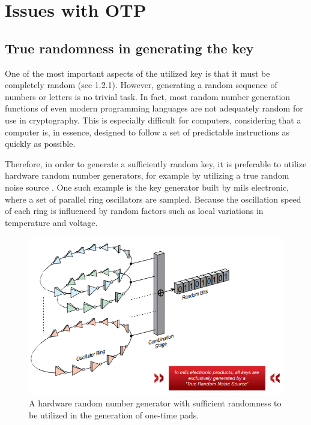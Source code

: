 \documentclass[12pt]{report}
\begin{document}
\section{Issues with OTP}
\subsection{True randomness in generating the key}
One of the most important aspects of the utilized key is that it must be completely random (see 1.2.1). However, generating a random sequence of numbers or letters is no trivial task. In fact, most random number generation functions of even modern programming languages are not adequately random for use in cryptography. This is especially difficult for computers, considering that a computer is, in essence, designed to follow a set of predictable instructions as quickly as possible.

Therefore, in order to generate a sufficiently random key, it is preferable to utilize hardware random number generators, for example by utilizing a true random noise source \cite{MilsElectronic}. One such example is the key generator built by mils electronic, where a set of parallel ring oscillators are sampled. Because the oscillation speed of each ring is influenced by random factors such as local variations in temperature and voltage.

\begin{figure}[H]
\centering
\includegraphics[scale=0.75]{MilsElectronic.PNG}
\caption{A hardware random number generator with sufficient randomness to be utilized in the generation of one-time pads.}
\end{figure}
\end{document}
